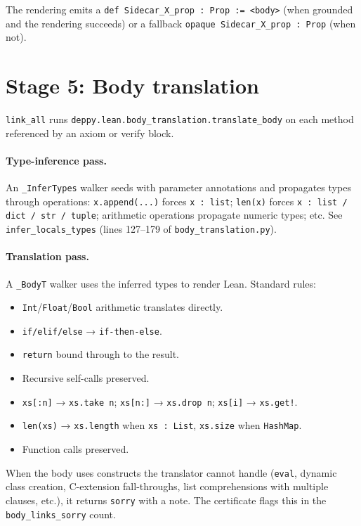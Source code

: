 The rendering emits a \texttt{def Sidecar\_X\_prop : Prop := <body>}
(when grounded and the rendering succeeds) or a fallback
\texttt{opaque Sidecar\_X\_prop : Prop} (when not).

\section{Stage 5: Body translation}
\label{sec:body-translation}

\texttt{link\_all} runs
\texttt{deppy.lean.body\_translation.translate\_body} on each method
referenced by an axiom or verify block.

\paragraph{Type-inference pass.}  An \texttt{\_InferTypes} walker
seeds with parameter annotations and propagates types through
operations: \texttt{x.append(...)} forces \texttt{x : list};
\texttt{len(x)} forces \texttt{x : list / dict / str / tuple};
arithmetic operations propagate numeric types; etc.  See
\texttt{infer\_locals\_types} (lines 127--179 of
\texttt{body\_translation.py}).

\paragraph{Translation pass.}  A \texttt{\_BodyT} walker uses the
inferred types to render Lean.  Standard rules:
\begin{itemize}[leftmargin=1.7em]
  \item \texttt{Int}/\texttt{Float}/\texttt{Bool} arithmetic translates
    directly.
  \item \texttt{if/elif/else} → \texttt{if-then-else}.
  \item \texttt{return} bound through to the result.
  \item Recursive self-calls preserved.
  \item \texttt{xs[:n]} → \texttt{xs.take n}; \texttt{xs[n:]} →
    \texttt{xs.drop n}; \texttt{xs[i]} → \texttt{xs.get!}.
  \item \texttt{len(xs)} → \texttt{xs.length} when \texttt{xs : List},
    \texttt{xs.size} when \texttt{HashMap}.
  \item Function calls preserved.
\end{itemize}

When the body uses constructs the translator cannot handle
(\texttt{eval}, dynamic class creation, C-extension
fall-throughs, list comprehensions with multiple clauses, etc.), it
returns \texttt{sorry} with a note.  The certificate flags this in
the \texttt{body\_links\_sorry} count.

